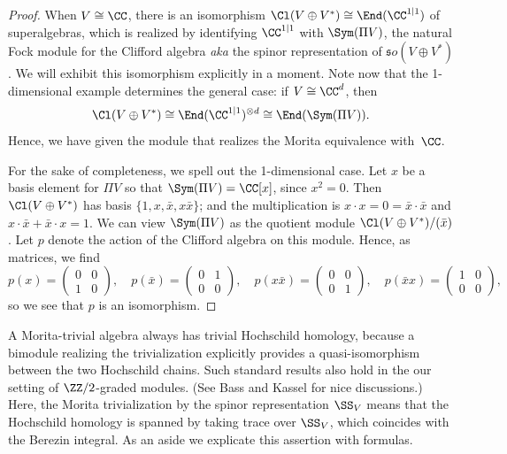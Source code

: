 \documentclass[10pt]{amsart}
\begin{document}
\begin{proof}
When $V \cong \CC$, there is an isomorphism $\Cl(V \oplus V^*) \cong \End(\CC^{1|1})$ of superalgebras, 
which is realized by identifying $\CC^{1|1}$ with $\Sym(\Pi V)$, the natural Fock module for the Clifford algebra {\em aka} the spinor representation of ${\mathfrak so}(V\oplus V^*)$.
We will exhibit this isomorphism explicitly in a moment.
Note now that the 1-dimensional example determines the general case:
if $V \cong \CC^d$, then 
\[
\Cl(V \oplus V^*) \cong \End(\CC^{1|1})^{\otimes d} \cong \End(\Sym(\Pi V)) .
\]
Hence, we have given the module that realizes the Morita equivalence with~$\CC$.

For the sake of completeness, we spell out the 1-dimensional case.
Let $x$ be a basis element for $\Pi V$ so that $\Sym(\Pi V) = \CC[x]$, since $x^2 = 0$.
Then $\Cl(V \oplus V^*)$ has basis $\{1,x,\bar{x}, x \bar{x}\}$; 
and the multiplication is $x \cdot x= 0 = \bar{x} \cdot \bar{x}$ and $x \cdot \bar{x} + \bar{x} \cdot x = 1$.
We can view $\Sym(\Pi V)$ as the quotient module $\Cl(V \oplus V^*)/(\bar{x})$.
Let $p$ denote the action of the Clifford algebra on this module.
Hence, as matrices, we find
\[
p(x) =
\begin{pmatrix}
0 & 0 \\
1 & 0
\end{pmatrix},\quad
p(\bar{x}) =
\begin{pmatrix}
0 & 1 \\
0 & 0
\end{pmatrix},\quad
p(x\bar{x}) =
\begin{pmatrix}
0 & 0 \\
0 & 1
\end{pmatrix},\quad
p(\bar{x}x) =
\begin{pmatrix}
1 & 0 \\
0 & 0
\end{pmatrix},
\]
so we see that $p$ is an isomorphism.
\end{proof}

A Morita-trivial algebra always has trivial Hochschild homology,
because a bimodule realizing the trivialization explicitly provides a quasi-isomorphism between the two Hochschild chains.
Such standard results also hold in the our setting of $\ZZ/2$-graded modules.
(See Bass \cite{Bass} and Kassel \cite{KasZ2} for nice discussions.)
Here, the Morita trivialization by the spinor representation $\SS_V$ means that the Hochschild homology is spanned by taking trace over $\SS_V$,
which coincides with the Berezin integral.
As an aside we explicate this assertion with formulas.
\end{document}
